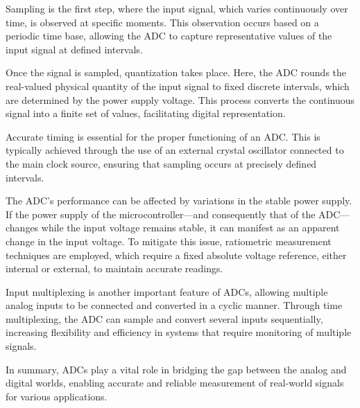 Sampling is the first step, where the input signal, which varies continuously over time, is observed at specific moments. 
This observation occurs based on a periodic time base, allowing the ADC to capture representative values of the input signal at defined intervals.

Once the signal is sampled, quantization takes place. Here, the ADC rounds the real-valued physical quantity of the input signal to fixed discrete intervals, which are determined by the power supply voltage. 
This process converts the continuous signal into a finite set of values, facilitating digital representation.

Accurate timing is essential for the proper functioning of an ADC. 
This is typically achieved through the use of an external crystal oscillator connected to the main clock source, ensuring that sampling occurs at precisely defined intervals.

The ADC's performance can be affected by variations in the stable power supply. 
If the power supply of the microcontroller—and consequently that of the ADC—changes while the input voltage remains stable, it can manifest as an apparent change in the input voltage. 
To mitigate this issue, ratiometric measurement techniques are employed, which require a fixed absolute voltage reference, either internal or external, to maintain accurate readings.

Input multiplexing is another important feature of ADCs, allowing multiple analog inputs to be connected and converted in a cyclic manner. 
Through time multiplexing, the ADC can sample and convert several inputs sequentially, increasing flexibility and efficiency in systems that require monitoring of multiple signals.

In summary, ADCs play a vital role in bridging the gap between the analog and digital worlds, enabling accurate and reliable measurement of real-world signals for various applications.